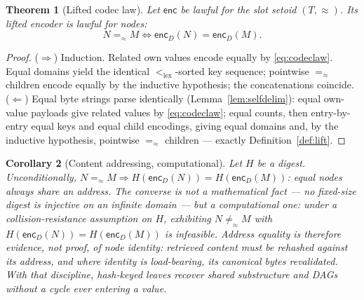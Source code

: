 \documentclass[11pt]{article}
\newtheorem{theorem}{Theorem}[section]
\newtheorem{corollary}[theorem]{Corollary}
\theoremstyle{definition}
\newcommand{\eqS}{=_{\approx}}                     %
\newcommand{\lex}{<_{\mathrm{lex}}}
\newcommand{\enc}{\mathsf{enc}}
\newcommand{\encD}{\mathsf{enc}_{\!D}}
\begin{document}
\begin{theorem}[Lifted codec law]\label{thm:codec}
Let $\enc$ be lawful for the slot setoid $(T,\approx)$.
Its lifted encoder is lawful for nodes:
\[
N \eqS M \iff \encD(N) = \encD(M).
\]
\end{theorem}

\begin{proof}
($\Rightarrow$) Induction. Related own values encode equally by
\eqref{eq:codeclaw}. Equal domains yield the identical $\lex$-sorted key sequence;
pointwise $\eqS$ children encode equally by the inductive hypothesis; the
concatenations coincide.
($\Leftarrow$) Equal byte strings parse identically (Lemma~\ref{lem:selfdelim}):
equal own-value payloads give related values by \eqref{eq:codeclaw};
equal counts, then entry-by-entry equal keys and equal child
encodings, giving equal domains and, by the inductive hypothesis, pointwise
$\eqS$ children --- exactly Definition~\ref{def:lift}.
\end{proof}

\begin{corollary}[Content addressing, computational]
Let $H$ be a digest. Unconditionally, $N \eqS M \Rightarrow H(\encD(N)) =
H(\encD(M))$: equal nodes always share an address. The converse is not a mathematical
fact --- no fixed-size digest is injective on an infinite domain --- but a
computational one: under a collision-resistance assumption on $H$, exhibiting
$N \not\eqS M$ with $H(\encD(N)) = H(\encD(M))$ is infeasible. Address equality is
therefore evidence, not proof, of node identity: retrieved content must be rehashed
against its address, and where identity is load-bearing, its canonical bytes
revalidated. With that discipline, hash-keyed leaves recover shared substructure and
DAGs without a cycle ever entering a value.
\end{corollary}
\end{document}
